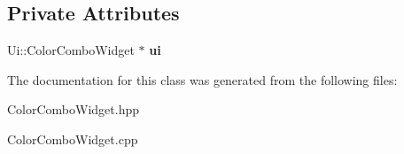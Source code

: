 \subsection*{Private Attributes}
\begin{DoxyCompactItemize}
\item 
Ui\+::\+Color\+Combo\+Widget $\ast$ {\bfseries ui}\hypertarget{classColorComboWidget_ab099055405453ffec51397ccc4a807f8}{}\label{classColorComboWidget_ab099055405453ffec51397ccc4a807f8}

\end{DoxyCompactItemize}


The documentation for this class was generated from the following files\+:\begin{DoxyCompactItemize}
\item 
Color\+Combo\+Widget.\+hpp\item 
Color\+Combo\+Widget.\+cpp\end{DoxyCompactItemize}
